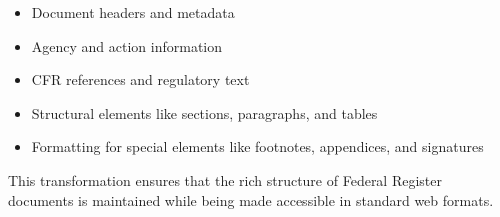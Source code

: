 \begin{itemize}
  \item Document headers and metadata
  \item Agency and action information
  \item CFR references and regulatory text
  \item Structural elements like sections, paragraphs, and tables
  \item Formatting for special elements like footnotes, appendices, and signatures
\end{itemize}

This transformation ensures that the rich structure of Federal Register documents is maintained while being made accessible in standard web formats.
